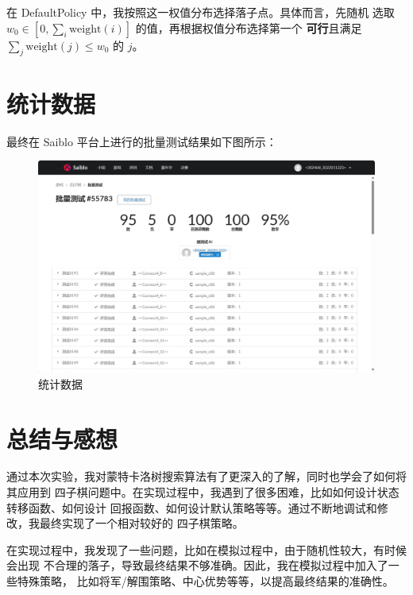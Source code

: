 \documentclass[UTF8]{ctexart}
\begin{document}
在 DefaultPolicy 中，我按照这一权值分布选择落子点。具体而言，先随机
选取 $w_0 \in [0, \sum_i\text{weight}(i)]$ 的值，再根据权值分布选择第一个
\textbf{可行}且满足 $\sum_j\text{weight}(j) \le w_0$ 的 $j$。

\subsection{}

\section{统计数据}

最终在 Saiblo 平台上进行的批量测试结果如下图所示：

\begin{figure}[H]
    \centering
    \includegraphics[width=\textwidth]{../assets/result.png}
    \caption{统计数据}
\end{figure}

\section{总结与感想}

通过本次实验，我对蒙特卡洛树搜索算法有了更深入的了解，同时也学会了如何将其应用到
四子棋问题中。在实现过程中，我遇到了很多困难，比如如何设计状态转移函数、如何设计
回报函数、如何设计默认策略等等。通过不断地调试和修改，我最终实现了一个相对较好的
四子棋策略。

在实现过程中，我发现了一些问题，比如在模拟过程中，由于随机性较大，有时候会出现
不合理的落子，导致最终结果不够准确。因此，我在模拟过程中加入了一些特殊策略，
比如将军/解围策略、中心优势等等，以提高最终结果的准确性。
\end{document}
